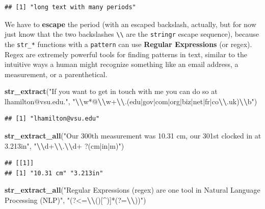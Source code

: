 \documentclass[
]{book}
\newenvironment{Shaded}{\begin{snugshade}}{\end{snugshade}}
\newcommand{\FunctionTok}[1]{\textcolor[rgb]{0.13,0.29,0.53}{\textbf{#1}}}
\newcommand{\NormalTok}[1]{#1}
\newcommand{\SpecialCharTok}[1]{\textcolor[rgb]{0.81,0.36,0.00}{\textbf{#1}}}
\newcommand{\StringTok}[1]{\textcolor[rgb]{0.31,0.60,0.02}{#1}}
\begin{document}
\begin{verbatim}
## [1] "long text with many periods"
\end{verbatim}

We have to \textbf{escape} the period (with an escaped backslash, actually, but for now just know that the two backslashes \texttt{\textbackslash{}\textbackslash{}} are the \texttt{stringr} escape sequence), because the \texttt{str\_*} functions with a \texttt{pattern} can use \textbf{Regular Expressions} (or regex). Regex are extremely powerful tools for finding patterns in text, similar to the intuitive ways a human might recognize something like an email address, a measurement, or a parenthetical.

\begin{Shaded}
\begin{Highlighting}[]
\FunctionTok{str\_extract}\NormalTok{(}\StringTok{"If you want to get in touch with me you can do so at lhamilton@vsu.edu."}\NormalTok{,}
            \StringTok{"}\SpecialCharTok{\textbackslash{}\textbackslash{}}\StringTok{w*@}\SpecialCharTok{\textbackslash{}\textbackslash{}}\StringTok{w+}\SpecialCharTok{\textbackslash{}\textbackslash{}}\StringTok{.(edu|gov|com|org|biz|net|fr|co}\SpecialCharTok{\textbackslash{}\textbackslash{}}\StringTok{.uk)}\SpecialCharTok{\textbackslash{}\textbackslash{}}\StringTok{b"}\NormalTok{)}
\end{Highlighting}
\end{Shaded}

\begin{verbatim}
## [1] "lhamilton@vsu.edu"
\end{verbatim}

\begin{Shaded}
\begin{Highlighting}[]
\FunctionTok{str\_extract\_all}\NormalTok{(}\StringTok{"Our 300th measurement was 10.31 cm, our 301st clocked in at 3.213in"}\NormalTok{,}
            \StringTok{"}\SpecialCharTok{\textbackslash{}\textbackslash{}}\StringTok{d+}\SpecialCharTok{\textbackslash{}\textbackslash{}}\StringTok{.}\SpecialCharTok{\textbackslash{}\textbackslash{}}\StringTok{d+ ?(cm|in|m)"}\NormalTok{)}
\end{Highlighting}
\end{Shaded}

\begin{verbatim}
## [[1]]
## [1] "10.31 cm" "3.213in"
\end{verbatim}

\begin{Shaded}
\begin{Highlighting}[]
\FunctionTok{str\_extract\_all}\NormalTok{(}\StringTok{"Regular Expressions (regex) are one tool in Natural Language Processing (NLP)"}\NormalTok{,}
            \StringTok{"(?\textless{}=}\SpecialCharTok{\textbackslash{}\textbackslash{}}\StringTok{()[\^{})]*(?=}\SpecialCharTok{\textbackslash{}\textbackslash{}}\StringTok{))"}\NormalTok{)}
\end{Highlighting}
\end{Shaded}
\end{document}
